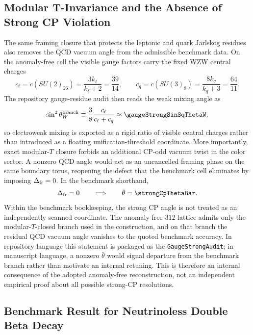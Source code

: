 \documentclass[11pt]{article}
\begin{document}
\subsection{Modular T-Invariance and the Absence of Strong CP Violation}

The same framing closure that protects the leptonic and quark Jarlskog
residues also removes the QCD vacuum angle from the admissible benchmark data.
On the anomaly-free cell the visible gauge factors carry the fixed WZW central
charges
\begin{equation}
 c_{\ell}=c\!\left(SU(2)_{26}\right)=\frac{3k_{\ell}}{k_{\ell}+2}=\frac{39}{14},
 \qquad
 c_q=c\!\left(SU(3)_8\right)=\frac{8k_q}{k_q+3}=\frac{64}{11}.
\end{equation}
The repository gauge-residue audit then reads the weak mixing angle as
\begin{equation}
 \sin^2\theta_W^{\rm branch}
 \equiv
 \frac{3}{8}\frac{c_{\ell}}{c_{\ell}+c_q}
 \approx
 \gaugeStrongSinSqThetaW,
\end{equation}
so electroweak mixing is exported as a rigid ratio of visible central charges
rather than introduced as a floating unification-threshold coordinate. More
importantly, exact modular-$T$ closure forbids an additional CP-odd vacuum twist
in the color sector. A nonzero QCD angle would act as an uncancelled framing
phase on the same boundary torus, reopening the defect that the benchmark cell
eliminates by imposing $\Delta_{\rm fr}=0$. In the benchmark shorthand,
\begin{equation}
 \Delta_{\rm fr}=0
 \qquad\Longrightarrow\qquad
 \bar\theta=\strongCpThetaBar.
\end{equation}
Within the benchmark bookkeeping, the strong CP angle is not treated as an
independently scanned coordinate. The anomaly-free $312$-lattice admits only the
modular-$T$-closed branch used in the construction, and on that branch the
residual QCD vacuum angle vanishes to the quoted benchmark accuracy. In
repository language this statement is packaged as the \texttt{GaugeStrongAudit};
in manuscript language, a nonzero $\bar\theta$ would signal departure from the
benchmark branch rather than motivate an internal retuning. This is therefore
an internal consequence of the adopted anomaly-free reconstruction, not an
independent empirical proof about all possible strong-CP resolutions.

\subsection{Benchmark Result for Neutrinoless Double Beta Decay}
\end{document}

